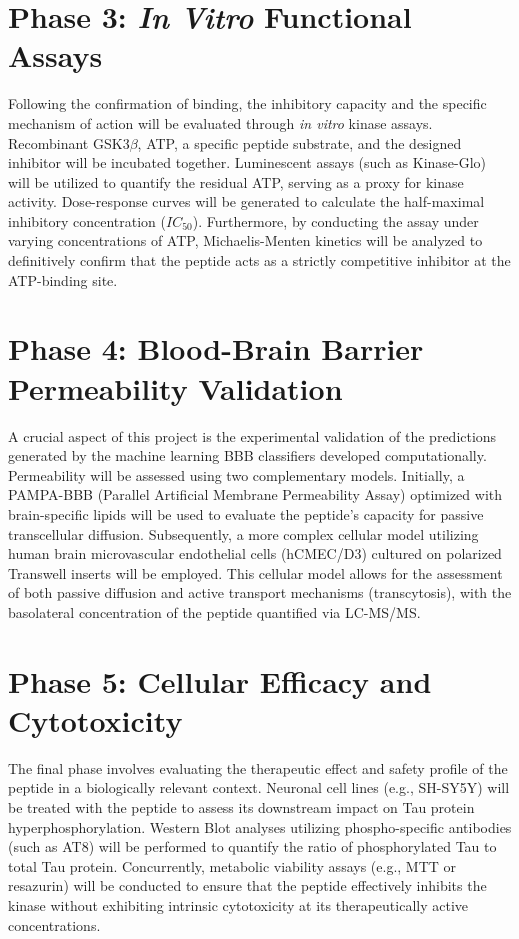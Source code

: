\documentclass[11pt,a4paper]{article}
\begin{document}
\section*{Phase 3: \textit{In Vitro} Functional Assays}
Following the confirmation of binding, the inhibitory capacity and the specific mechanism of action will be evaluated through \textit{in vitro} kinase assays. Recombinant GSK3$\beta$, ATP, a specific peptide substrate, and the designed inhibitor will be incubated together. Luminescent assays (such as Kinase-Glo) will be utilized to quantify the residual ATP, serving as a proxy for kinase activity. Dose-response curves will be generated to calculate the half-maximal inhibitory concentration ($IC_{50}$). Furthermore, by conducting the assay under varying concentrations of ATP, Michaelis-Menten kinetics will be analyzed to definitively confirm that the peptide acts as a strictly competitive inhibitor at the ATP-binding site.

\section*{Phase 4: Blood-Brain Barrier Permeability Validation}
A crucial aspect of this project is the experimental validation of the predictions generated by the machine learning BBB classifiers developed computationally. Permeability will be assessed using two complementary models. Initially, a PAMPA-BBB (Parallel Artificial Membrane Permeability Assay) optimized with brain-specific lipids will be used to evaluate the peptide's capacity for passive transcellular diffusion. Subsequently, a more complex cellular model utilizing human brain microvascular endothelial cells (hCMEC/D3) cultured on polarized Transwell inserts will be employed. This cellular model allows for the assessment of both passive diffusion and active transport mechanisms (transcytosis), with the basolateral concentration of the peptide quantified via LC-MS/MS.

\section*{Phase 5: Cellular Efficacy and Cytotoxicity}
The final phase involves evaluating the therapeutic effect and safety profile of the peptide in a biologically relevant context. Neuronal cell lines (e.g., SH-SY5Y) will be treated with the peptide to assess its downstream impact on Tau protein hyperphosphorylation. Western Blot analyses utilizing phospho-specific antibodies (such as AT8) will be performed to quantify the ratio of phosphorylated Tau to total Tau protein. Concurrently, metabolic viability assays (e.g., MTT or resazurin) will be conducted to ensure that the peptide effectively inhibits the kinase without exhibiting intrinsic cytotoxicity at its therapeutically active concentrations.
\end{document}
